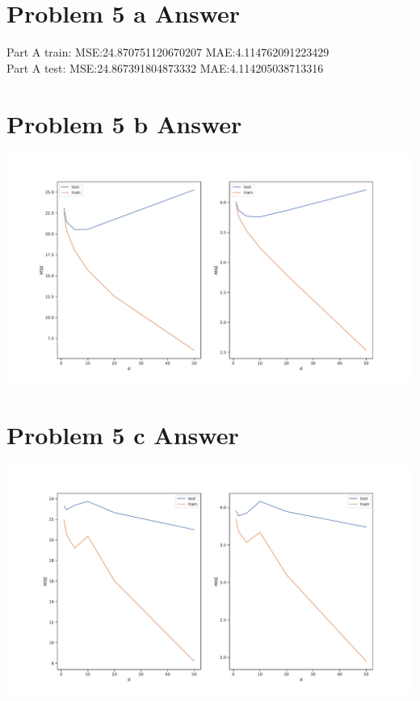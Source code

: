 \documentclass{article}
\newcommand{\1}{\mathbf{1}}
\begin{document}
\section*{Problem 5 a Answer}

Part A train:   MSE:24.870751120670207	MAE:4.114762091223429 \\
Part A test:	MSE:24.867391804873332	MAE:4.114205038713316 \\

\section*{Problem 5 b Answer}
\begin{center}
    \includegraphics[width=.9\textwidth]{hw3/5b.pdf}
\end{center}

\section*{Problem 5 c Answer}

\begin{center}
    \includegraphics[width=.9\textwidth]{hw3/5c.pdf}
\end{center}
\end{document}
